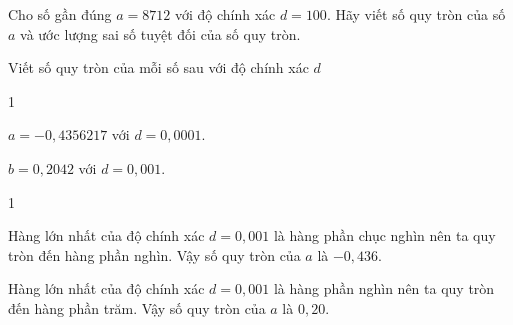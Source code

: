 \begin{bt}%
	Cho số gần đúng $a=8712$ với độ chính xác $d=100$. Hãy viết số quy tròn của số $a$ và ước lượng sai số tuyệt đối của số quy tròn.
\end{bt}

\begin{bt}%
	Viết số quy tròn của mỗi số sau với độ chính xác $d$
	\begin{enumEX}[a)]{1}
		\item $a=-0{,}4356217$ với $d=0{,}0001$.
		\item $b=0{,}2042$ với $d=0{,}001$.
	\end{enumEX}  
	\loigiai
	{
		\begin{enumEX}[a)]{1}
			\item Hàng lớn nhất của độ chính xác $d=0{,}001$ là hàng phần chục nghìn nên ta quy tròn đến hàng phần nghìn. Vậy số quy tròn của $a$ là $-0{,}436$.
			\item Hàng lớn nhất của độ chính xác $d=0{,}001$ là hàng phần nghìn nên ta quy tròn đến hàng phần trăm. Vậy số quy tròn của $a$ là $0{,}20$.
		\end{enumEX}  
	}
\end{bt}

